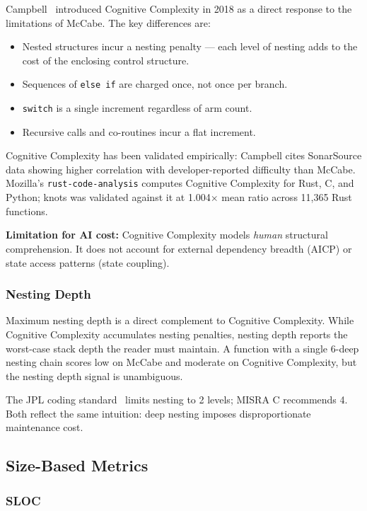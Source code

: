 \documentclass[10pt,twocolumn,letterpaper]{article}
\begin{document}
Campbell~\cite{cognitive-complexity} introduced Cognitive Complexity in
2018 as a direct response to the limitations of McCabe.  The key
differences are:

\begin{itemize}
    \item Nested structures incur a nesting penalty --- each level of
        nesting adds to the cost of the enclosing control structure.
    \item Sequences of \texttt{else if} are charged once, not once per
        branch.
    \item \texttt{switch} is a single increment regardless of arm count.
    \item Recursive calls and co-routines incur a flat increment.
\end{itemize}

Cognitive Complexity has been validated empirically: Campbell cites
SonarSource data showing higher correlation with developer-reported
difficulty than McCabe.  Mozilla's \texttt{rust-code-analysis} computes
Cognitive Complexity for Rust, C, and Python; knots was validated against
it at 1.004$\times$ mean ratio across 11,365 Rust functions.

\textbf{Limitation for AI cost:} Cognitive Complexity models \emph{human}
structural comprehension.  It does not account for external dependency
breadth (AICP) or state access patterns (state coupling).

\subsubsection{Nesting Depth}

Maximum nesting depth is a direct complement to Cognitive Complexity.
While Cognitive Complexity accumulates nesting penalties, nesting depth
reports the worst-case stack depth the reader must maintain.  A function
with a single 6-deep nesting chain scores low on McCabe and moderate on
Cognitive Complexity, but the nesting depth signal is unambiguous.

The JPL coding standard~\cite{jpl} limits nesting to 2 levels; MISRA C
recommends 4.  Both reflect the same intuition: deep nesting imposes
disproportionate maintenance cost.

\subsection{Size-Based Metrics}

\subsubsection{SLOC}
\end{document}
